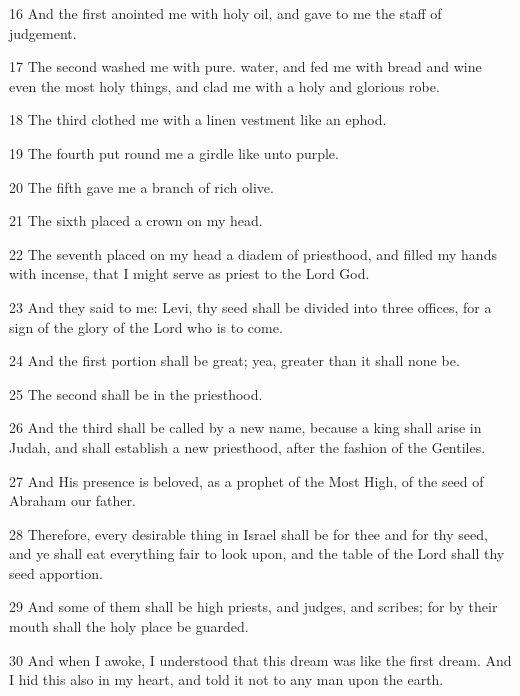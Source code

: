 \par 16 And the first anointed me with holy oil, and gave to me the staff of judgement.

\par 17 The second washed me with pure. water, and fed me with bread and wine even the most holy things, and clad me with a holy and glorious robe.

\par 18 The third clothed me with a linen vestment like an ephod.

\par 19 The fourth put round me a girdle like unto purple.

\par 20 The fifth gave me a branch of rich olive.

\par 21 The sixth placed a crown on my head.

\par 22 The seventh placed on my head a diadem of priesthood, and filled my hands with incense, that I might serve as priest to the Lord God.

\par 23 And they said to me: Levi, thy seed shall be divided into three offices, for a sign of the glory of the Lord who is to come.

\par 24 And the first portion shall be great; yea, greater than it shall none be.

\par 25 The second shall be in the priesthood.

\par 26 And the third shall be called by a new name, because a king shall arise in Judah, and shall establish a new priesthood, after the fashion of the Gentiles.

\par 27 And His presence is beloved, as a prophet of the Most High, of the seed of Abraham our father.

\par 28 Therefore, every desirable thing in Israel shall be for thee and for thy seed, and ye shall eat everything fair to look upon, and the table of the Lord shall thy seed apportion.

\par 29 And some of them shall be high priests, and judges, and scribes; for by their mouth shall the holy place be guarded.

\par 30 And when I awoke, I understood that this dream was like the first dream. And I hid this also in my heart, and told it not to any man upon the earth.

